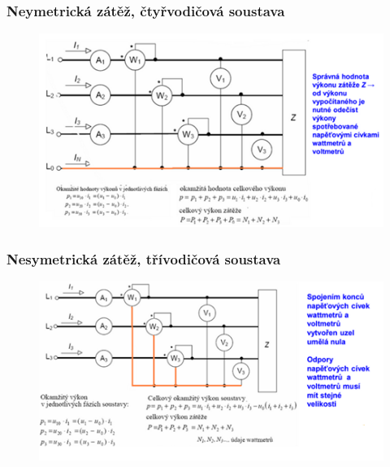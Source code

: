 \subsubsection*{Neymetrická zátěž, čtyřvodičová soustava}
\begin{figure}[H]
    \includegraphics*[scale = 1.2]{images/nesym_4.png}
\end{figure}
\newpage

\subsubsection*{Nesymetrická zátěž, třívodičová soustava}
\begin{figure}[H]
    \includegraphics*[scale = 1.2]{images/nesym_3.png}
\end{figure}

